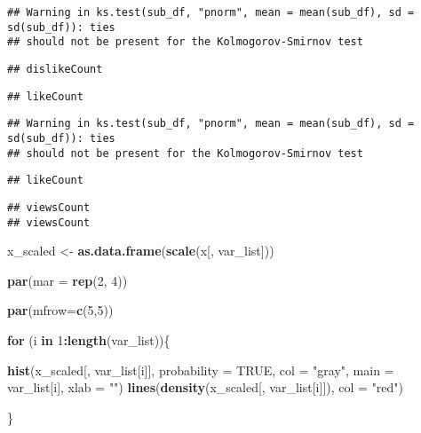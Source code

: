 \documentclass[
]{article}
\newenvironment{Shaded}{\begin{snugshade}}{\end{snugshade}}
\newcommand{\ControlFlowTok}[1]{\textcolor[rgb]{0.13,0.29,0.53}{\textbf{#1}}}
\newcommand{\DataTypeTok}[1]{\textcolor[rgb]{0.13,0.29,0.53}{#1}}
\newcommand{\DecValTok}[1]{\textcolor[rgb]{0.00,0.00,0.81}{#1}}
\newcommand{\KeywordTok}[1]{\textcolor[rgb]{0.13,0.29,0.53}{\textbf{#1}}}
\newcommand{\NormalTok}[1]{#1}
\newcommand{\OperatorTok}[1]{\textcolor[rgb]{0.81,0.36,0.00}{\textbf{#1}}}
\newcommand{\OtherTok}[1]{\textcolor[rgb]{0.56,0.35,0.01}{#1}}
\newcommand{\StringTok}[1]{\textcolor[rgb]{0.31,0.60,0.02}{#1}}
\begin{document}
\begin{verbatim}
## Warning in ks.test(sub_df, "pnorm", mean = mean(sub_df), sd = sd(sub_df)): ties
## should not be present for the Kolmogorov-Smirnov test
\end{verbatim}

\begin{verbatim}
## dislikeCount
\end{verbatim}

\begin{verbatim}
## likeCount
\end{verbatim}

\begin{verbatim}
## Warning in ks.test(sub_df, "pnorm", mean = mean(sub_df), sd = sd(sub_df)): ties
## should not be present for the Kolmogorov-Smirnov test
\end{verbatim}

\begin{verbatim}
## likeCount
\end{verbatim}

\begin{verbatim}
## viewsCount
## viewsCount
\end{verbatim}

\begin{Shaded}
\begin{Highlighting}[]
\NormalTok{x_scaled <-}\StringTok{ }\KeywordTok{as.data.frame}\NormalTok{(}\KeywordTok{scale}\NormalTok{(x[, var_list]))}

\KeywordTok{par}\NormalTok{(}\DataTypeTok{mar =} \KeywordTok{rep}\NormalTok{(}\DecValTok{2}\NormalTok{, }\DecValTok{4}\NormalTok{))}

\KeywordTok{par}\NormalTok{(}\DataTypeTok{mfrow=}\KeywordTok{c}\NormalTok{(}\DecValTok{5}\NormalTok{,}\DecValTok{5}\NormalTok{))}

\ControlFlowTok{for}\NormalTok{ (i }\ControlFlowTok{in} \DecValTok{1}\OperatorTok{:}\KeywordTok{length}\NormalTok{(var_list))\{}
  
  \KeywordTok{hist}\NormalTok{(x_scaled[, var_list[i]], }\DataTypeTok{probability =} \OtherTok{TRUE}\NormalTok{, }\DataTypeTok{col =} \StringTok{"gray"}\NormalTok{, }\DataTypeTok{main =}\NormalTok{ var_list[i], }\DataTypeTok{xlab =} \StringTok{""}\NormalTok{)}
  \KeywordTok{lines}\NormalTok{(}\KeywordTok{density}\NormalTok{(x_scaled[, var_list[i]]), }\DataTypeTok{col =} \StringTok{"red"}\NormalTok{)}

\NormalTok{\}}
\end{Highlighting}
\end{Shaded}
\end{document}
